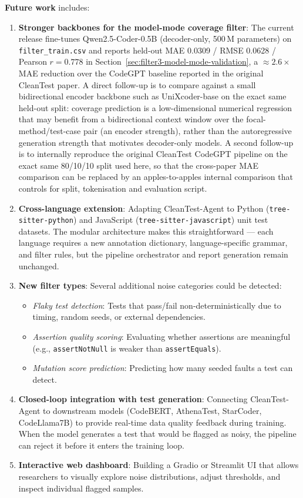 \documentclass[acmlarge,nonacm,screen]{acmart}
\begin{document}
\textbf{Future work} includes:
\begin{enumerate}
    \item \textbf{Stronger backbones for the model-mode coverage filter}: The current release fine-tunes Qwen2.5-Coder-0.5B (decoder-only, 500\,M parameters) on \texttt{filter\_train.csv} and reports held-out MAE 0.0309 / RMSE 0.0628 / Pearson $r = 0.778$ in Section~\ref{sec:filter3-model-mode-validation}, a $\approx 2.6\times$ MAE reduction over the CodeGPT baseline reported in the original CleanTest paper. A direct follow-up is to compare against a small bidirectional encoder backbone such as UniXcoder-base on the exact same held-out split: coverage prediction is a low-dimensional numerical regression that may benefit from a bidirectional context window over the focal-method/test-case pair (an encoder strength), rather than the autoregressive generation strength that motivates decoder-only models. A second follow-up is to internally reproduce the original CleanTest CodeGPT pipeline on the exact same 80/10/10 split used here, so that the cross-paper MAE comparison can be replaced by an apples-to-apples internal comparison that controls for split, tokenisation and evaluation script.

    \item \textbf{Cross-language extension}: Adapting CleanTest-Agent to Python (\texttt{tree-sitter-python}) and JavaScript (\texttt{tree-sitter-javascript}) unit test datasets. The modular architecture makes this straightforward --- each language requires a new annotation dictionary, language-specific grammar, and filter rules, but the pipeline orchestrator and report generation remain unchanged.

    \item \textbf{New filter types}: Several additional noise categories could be detected:
    \begin{itemize}
        \item \textit{Flaky test detection}: Tests that pass/fail non-deterministically due to timing, random seeds, or external dependencies.
        \item \textit{Assertion quality scoring}: Evaluating whether assertions are meaningful (e.g., \texttt{assertNotNull} is weaker than \texttt{assertEquals}).
        \item \textit{Mutation score prediction}: Predicting how many seeded faults a test can detect.
    \end{itemize}

    \item \textbf{Closed-loop integration with test generation}: Connecting CleanTest-Agent to downstream models (CodeBERT, AthenaTest, StarCoder, CodeLlama7B) to provide real-time data quality feedback during training. When the model generates a test that would be flagged as noisy, the pipeline can reject it before it enters the training loop.

    \item \textbf{Interactive web dashboard}: Building a Gradio or Streamlit UI that allows researchers to visually explore noise distributions, adjust thresholds, and inspect individual flagged samples.
\end{enumerate}
\end{document}
